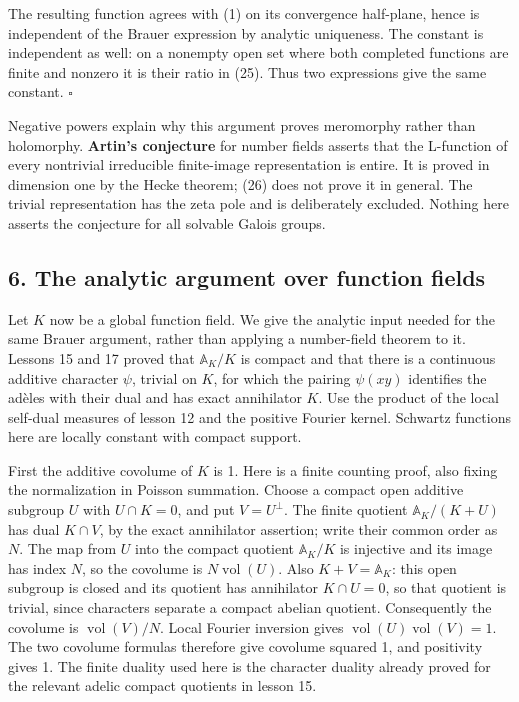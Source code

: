 \documentclass[11pt,a4paper]{article}
\begin{document}
The resulting function agrees with (1) on its convergence half-plane,
hence is independent of the Brauer expression by analytic uniqueness.
The constant is independent as well: on a nonempty open set where both
completed functions are finite and nonzero it is their ratio in (25).
Thus two expressions give the same constant. \(\square\)

Negative powers explain why this argument proves meromorphy rather than
holomorphy. \textbf{Artin's conjecture} for number fields asserts that
the L-function of every nontrivial irreducible finite-image
representation is entire. It is proved in dimension one by the Hecke
theorem; (26) does not prove it in general. The trivial representation
has the zeta pole and is deliberately excluded. Nothing here asserts the
conjecture for all solvable Galois groups.

\subsection{6. The analytic argument over function
fields}\label{the-analytic-argument-over-function-fields}

Let \(K\) now be a global function field. We give the analytic input
needed for the same Brauer argument, rather than applying a number-field
theorem to it. Lessons 15 and 17 proved that \(\mathbb A_K/K\) is
compact and that there is a continuous additive character \(\psi\),
trivial on \(K\), for which the pairing \(\psi(xy)\) identifies the
adèles with their dual and has exact annihilator \(K\). Use the product
of the local self-dual measures of lesson 12 and the positive Fourier
kernel. Schwartz functions here are locally constant with compact
support.

First the additive covolume of \(K\) is 1. Here is a finite counting
proof, also fixing the normalization in Poisson summation. Choose a
compact open additive subgroup \(U\) with \(U\cap K=0\), and put
\(V=U^\perp\). The finite quotient \(\mathbb A_K/(K+U)\) has dual
\(K\cap V\), by the exact annihilator assertion; write their common
order as \(N\). The map from \(U\) into the compact quotient
\(\mathbb A_K/K\) is injective and its image has index \(N\), so the
covolume is \(N\operatorname{vol}(U)\). Also \(K+V=\mathbb A_K\): this
open subgroup is closed and its quotient has annihilator \(K\cap U=0\),
so that quotient is trivial, since characters separate a compact abelian
quotient. Consequently the covolume is \(\operatorname{vol}(V)/N\).
Local Fourier inversion gives
\(\operatorname{vol}(U)\operatorname{vol}(V)=1\). The two covolume
formulas therefore give covolume squared 1, and positivity gives 1. The
finite duality used here is the character duality already proved for the
relevant adelic compact quotients in lesson 15.
\end{document}
